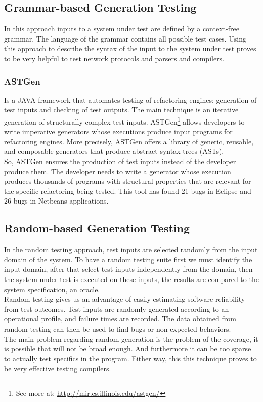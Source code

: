 \documentclass[10pt, conference, compsocconf]{IEEEtran}
\begin{document}
\subsection{Grammar-based Generation Testing}
In this approach inputs to a system under test are defined by a context-free grammar. The language of the grammar contains all possible test cases.
Using this approach to describe the syntax of the input to the system under test proves to be very helpful to test
network protocols\cite{tal:syntax-based,kaksonen2001functional} and parsers and compilers\cite{1994-burgess,Burgess_Saidi_1996}.

\subsubsection{\textbf{ASTGen}\cite{Daniel:2007:ATR:1287624.1287651}} Is a JAVA framework that automates testing of refactoring engines: generation of test inputs
and checking of test outputs. The main technique is an iterative generation of structurally complex test inputs.
ASTGen\footnote{See more at: \url{http://mir.cs.illinois.edu/astgen/}} allows developers to write imperative generators whose executions
produce input programs for refactoring engines. More precisely, ASTGen
offers a library of generic, reusable, and composable generators that produce abstract syntax trees (ASTs).\\
So, ASTGen ensures the production of test inputs instead of the developer produce them. The developer needs to write a generator whose execution
produces thousands of programs with structural properties that are relevant for the specific refactoring being tested. This tool has found
21 bugs in Eclipse and 26 bugs in Netbeans applications.

\subsection{Random-based Generation Testing}
In the random testing approach, test inputs are selected randomly from the input domain of the system.
To have a random testing suite first we must identify the input domain, after that select test inputs independently from the domain,
then the system under test is executed on these inputs, the results are compared to the system specification, an oracle.\\
Random testing gives us an advantage of easily estimating software reliability from test outcomes.
Test inputs are randomly generated according to an operational profile, and failure times are recorded.
The data obtained from random testing can then be used to find bugs or non expected behaviors.\\
\indent The main problem regarding random generation is the problem of the coverage, it is possible that will not be broad enough. And furthermore it can be
too sparse to actually test specifics in the program. Either way, this this technique proves to be very effective testing compilers.
\end{document}
